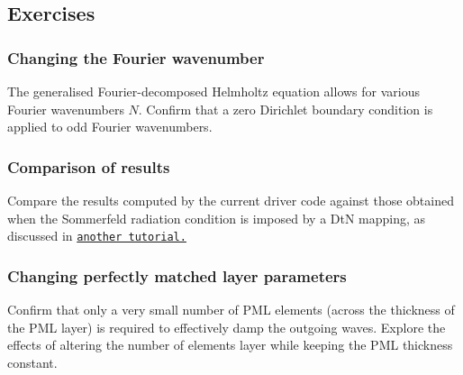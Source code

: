 \hypertarget{index_exer}{}\subsection{Exercises}\label{index_exer}
\hypertarget{index_Fwave}{}\subsubsection{Changing the Fourier wavenumber}\label{index_Fwave}
The generalised Fourier-\/decomposed Helmholtz equation allows for various Fourier wavenumbers $ N $. Confirm that a zero Dirichlet boundary condition is applied to odd Fourier wavenumbers.\hypertarget{index_dtn}{}\subsubsection{Comparison of results}\label{index_dtn}
Compare the results computed by the current driver code against those obtained when the Sommerfeld radiation condition is imposed by a DtN mapping, as discussed in \href{../../../fourier_decomposed_helmholtz/sphere_scattering/html/index.html}{\tt another tutorial.}\hypertarget{index_pmlsize}{}\subsubsection{Changing perfectly matched layer parameters}\label{index_pmlsize}
Confirm that only a very small number of P\+ML elements (across the thickness of the P\+ML layer) is required to effectively damp the outgoing waves. Explore the effects of altering the number of elements layer while keeping the P\+ML thickness constant.

